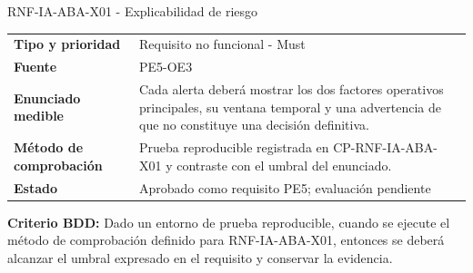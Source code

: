 \begin{reqbox}[colframe=Teal]{RNF-IA-ABA-X01 - Explicabilidad de riesgo}
\begin{tabularx}{\textwidth}{>{\bfseries}p{3.2cm}Y}
Tipo y prioridad & Requisito no funcional - Must \\
Fuente & PE5-OE3 \\
Enunciado medible & Cada alerta deberá mostrar los dos factores operativos principales, su ventana temporal y una advertencia de que no constituye una decisión definitiva. \\
Método de comprobación & Prueba reproducible registrada en CP-RNF-IA-ABA-X01 y contraste con el umbral del enunciado. \\
Estado & Aprobado como requisito PE5; evaluación pendiente \\
\end{tabularx}
\textbf{Criterio BDD:} Dado un entorno de prueba reproducible, cuando se ejecute el método de comprobación definido para RNF-IA-ABA-X01, entonces se deberá alcanzar el umbral expresado en el requisito y conservar la evidencia.
\end{reqbox}
